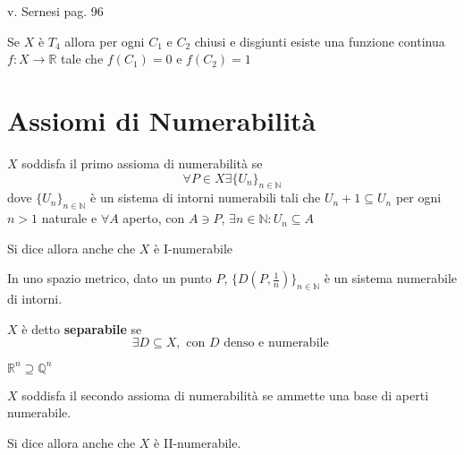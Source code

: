 \begin{example}[\(T_{3}\) non \(T_{4}\) ]
    v. Sernesi pag. 96
\end{example}

\begin{lemmao}
    Se \(X\) è \(T_{4}\) allora per ogni \(C_{1}\) e \(C_{2}\) chiusi e
    disgiunti esiste una funzione continua \(f: X \to \mathbb{R}\) tale
    che \(f(C_{1}) = 0\) e \(f(C_{2}) = 1\) 
\end{lemmao}

\section{Assiomi di Numerabilità}
\begin{definition}
    \(X\) soddisfa il primo assioma di numerabilità se 
    \[
        \forall P \in X \exists \{U_n\}_{n \in \mathbb{N}}
    \]
    dove \(\{U_n\}_{n \in \mathbb{N}} \) è un sistema di intorni numerabili tali
    che \(U_n+1 \subseteq U_n \) per ogni \(n > 1\) naturale e \(\forall  A\)
    aperto, con \(A \ni P\), \(\exists n \in \mathbb{N} : U_n \subseteq A \)

    Si dice allora anche che \(X\) è I-numerabile
\end{definition}

\begin{example}
    In uno spazio metrico, dato un punto \(P\), \(\{D(P, \frac{1}{n})\}_{n \in
    \mathbb{N}} \) è un sistema numerabile di intorni.
\end{example}

\begin{definition}[X è Separabile]
    \(X\) è detto \textbf{separabile} se
    \[
        \exists D \subseteq X, \text{ con \(D\) denso e numerabile }
    \]
\end{definition}
\begin{example}
    \(\mathbb{R}^{n} \supseteq \mathbb{Q}^{n} \) 
\end{example}

\begin{definition}
    \(X\) soddisfa il secondo assioma di numerabilità se ammette una base di
    aperti numerabile.

    Si dice allora anche che \(X\) è II-numerabile.
\end{definition}

